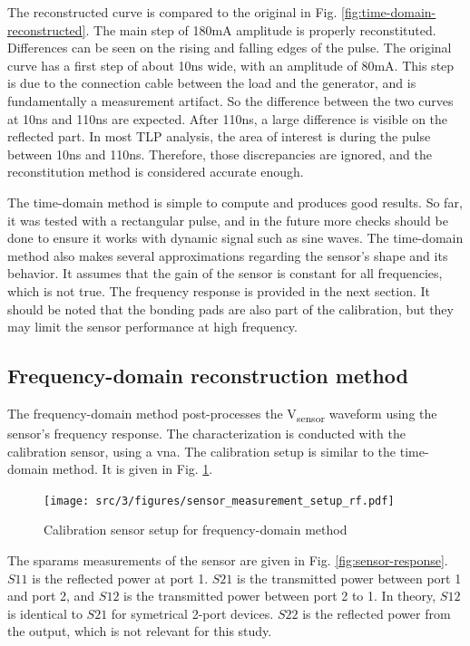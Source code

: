The reconstructed curve is compared to the original in Fig. \ref{fig:time-domain-reconstructed}.
The main step of 180mA amplitude is properly reconstituted.
Differences can be seen on the rising and falling edges of the pulse.
The original curve has a first step of about 10ns wide, with an amplitude of 80mA.
This step is due to the connection cable between the load and the generator, and is fundamentally a measurement artifact.
So the difference between the two curves at 10ns and 110ns are expected.
After 110ns, a large difference is visible on the reflected part.
In most TLP analysis, the area of interest is during the pulse between 10ns and 110ns.
Therefore, those discrepancies are ignored, and the reconstitution method is considered accurate enough.

The time-domain method is simple to compute and produces good results.
So far, it was tested with a rectangular pulse, and in the future more checks should be done to ensure it works with dynamic signal such as sine waves.
The time-domain method also makes several approximations regarding the sensor's shape and its behavior.
It assumes that the gain of the sensor is constant for all frequencies, which is not true.
The frequency response is provided in the next section.
It should be noted that the bonding pads are also part of the calibration, but they may limit the sensor performance at high frequency.

\subsection{Frequency-domain reconstruction method}

The frequency-domain method post-processes the V\textsubscript{sensor} waveform using the sensor's frequency response.
The characterization is conducted with the calibration sensor, using a \gls{vna}.
The calibration setup is similar to the time-domain method.
It is given in Fig. \ref{fig:calibration-sensor-rf}.

\begin{figure}[!h]
  \centering
  \texttt{[image: src/3/figures/sensor\_measurement\_setup\_rf.pdf]}
  \caption{Calibration sensor setup for frequency-domain method}
  \label{fig:calibration-sensor-rf}
\end{figure}

The \gls{sparams} measurements of the sensor are given in Fig. \ref{fig:sensor-response}.
$S11$ is the reflected power at port 1.
$S21$ is the transmitted power between port 1 and port 2, and $S12$ is the transmitted power between port 2 to 1.
In theory, $S12$ is identical to $S21$ for symetrical 2-port devices.
$S22$ is the reflected power from the output, which is not relevant for this study.

